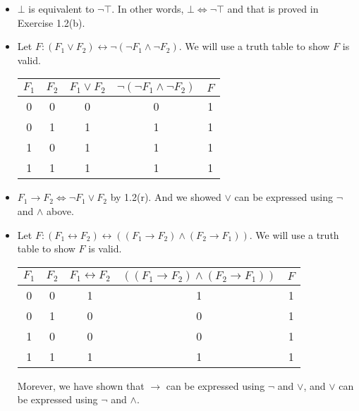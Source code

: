 \begin{exer}[1.3]
    $ $
    \begin{itemize}
        \item
            $\bot$ is equivalent to $\neg \top$.
            In other words, $\bot \Leftrightarrow \neg \top$ and that is proved in Exercise 1.2(b).
        \item
            Let $F: (F_1 \lor F_2) \leftrightarrow \neg(\neg F_1 \land \neg F_2)$.
            We will use a truth table to show $F$ is valid.
            \begin{center}
                \begin{tabular}{ |c|c||c|c|c| }
                    \hline
                        $F_1$ & $F_2$ & $F_1 \lor F_2$ & $\neg(\neg F_1 \land \neg F_2)$ & $F$ \\ \hline
                        0 & 0 & 0 & 0 & 1 \\ \hline
                        0 & 1 & 1 & 1 & 1 \\ \hline
                        1 & 0 & 1 & 1 & 1 \\ \hline
                        1 & 1 & 1 & 1 & 1 \\ \hline
                \end{tabular}
            \end{center}
        \item
            $F_1 \rightarrow F_2 \Leftrightarrow \neg F_1 \lor F_2$ by 1.2(r).
            And we showed $\lor$ can be expressed using $\neg$ and $\land$ above.
        \item
            Let $F: (F_1 \leftrightarrow F_2) \leftrightarrow ((F_1 \rightarrow F_2) \land (F_2 \rightarrow F_1))$.
            We will use a truth table to show $F$ is valid.
            \begin{center}
                \begin{tabular}{ |c|c||c|c|c| }
                    \hline
                        $F_1$ & $F_2$ & $F_1 \leftrightarrow F_2$ & $((F_1 \rightarrow F_2) \land (F_2 \rightarrow F_1))$ & $F$ \\ \hline
                        0 & 0 & 1 & 1 & 1 \\ \hline
                        0 & 1 & 0 & 0 & 1 \\ \hline
                        1 & 0 & 0 & 0 & 1 \\ \hline
                        1 & 1 & 1 & 1 & 1 \\ \hline
                \end{tabular}
            \end{center}
            Morever, we have shown that $\rightarrow$ can be expressed using $\neg$ and $\lor$, and $\lor$ can be expressed using $\neg$ and $\land$.
    \end{itemize}
\end{exer}

